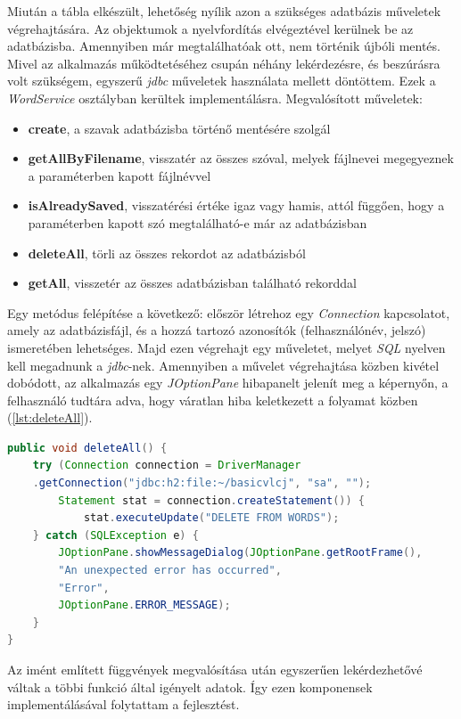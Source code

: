 Miután a tábla elkészült, lehetőség nyílik azon a szükséges adatbázis műveletek végrehajtására. Az objektumok a nyelvfordítás elvégeztével kerülnek be az adatbázisba. Amennyiben már megtalálhatóak ott, nem történik újbóli mentés. Mivel az alkalmazás működtetéséhez csupán néhány lekérdezésre, és beszúrásra volt szükségem, egyszerű \textit{jdbc} műveletek használata mellett döntöttem. Ezek a \textit{WordService} osztályban kerültek implementálásra. Megvalósított műveletek:
\begin{itemize}
\item \textbf{create}, a szavak adatbázisba történő mentésére szolgál
\item \textbf{getAllByFilename}, visszatér az összes szóval, melyek fájlnevei megegyeznek a paraméterben kapott fájlnévvel
\item \textbf{isAlreadySaved}, visszatérési értéke igaz vagy hamis, attól függően, hogy a paraméterben kapott szó megtalálható-e már az adatbázisban
\item \textbf{deleteAll}, törli az összes rekordot az adatbázisból
\item \textbf{getAll}, visszetér az összes adatbázisban található rekorddal
\end{itemize}
Egy metódus felépítése a következő: először létrehoz egy \textit{Connection} kapcsolatot, amely az adatbázisfájl, és a hozzá tartozó azonosítók (felhasználónév, jelszó) ismeretében lehetséges. Majd ezen végrehajt egy műveletet, melyet \textit{SQL} nyelven kell megadnunk a \textit{jdbc}-nek. Amennyiben a művelet végrehajtása közben kivétel dobódott, az alkalmazás egy \textit{JOptionPane} hibapanelt jelenít meg a képernyőn, a felhasználó tudtára adva, hogy váratlan hiba keletkezett a folyamat közben (\ref{lst:deleteAll}).


\begin{spacing}{1.25}
\begin{lstlisting}[caption=Implementált deleteAll metódus, language=java, label={lst:deleteAll}]
public void deleteAll() {
    try (Connection connection = DriverManager
    .getConnection("jdbc:h2:file:~/basicvlcj", "sa", "");
        Statement stat = connection.createStatement()) {
            stat.executeUpdate("DELETE FROM WORDS");
    } catch (SQLException e) {
        JOptionPane.showMessageDialog(JOptionPane.getRootFrame(),
        "An unexpected error has occurred",
        "Error",
        JOptionPane.ERROR_MESSAGE);
    }
}
\end{lstlisting}
\end{spacing}

Az imént említett függvények megvalósítása után egyszerűen lekérdezhetővé váltak a többi funkció által igényelt adatok. Így ezen komponensek implementálásával folytattam a fejlesztést.